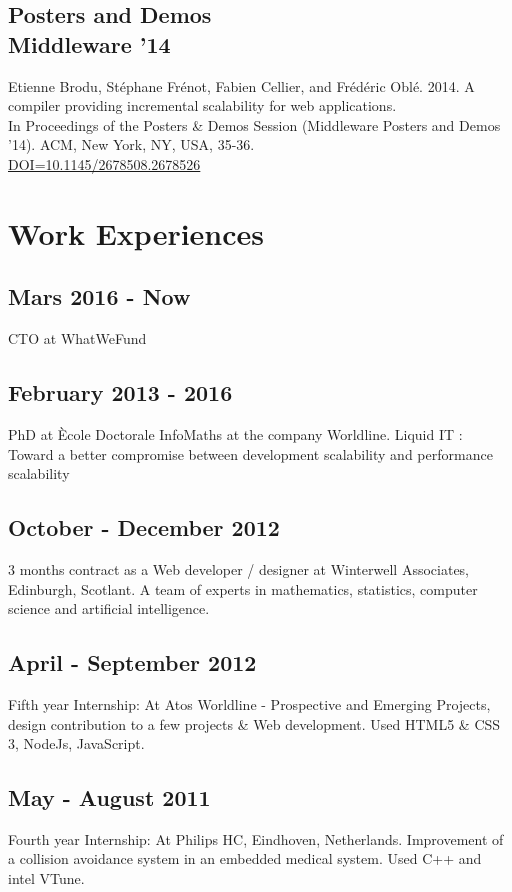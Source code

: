 	\subsection{Posters and Demos\\Middleware '14}{
		Etienne Brodu, Stéphane Frénot, Fabien Cellier, and Frédéric Oblé. 2014.
		A compiler providing incremental scalability for web applications.\\
		In Proceedings of the Posters \& Demos Session (Middleware Posters and Demos '14).
		ACM, New York, NY, USA, 35-36.\\
		\href{http://doi.acm.org/10.1145/2678508.2678526}{DOI=10.1145/2678508.2678526}
	}

\section{Work Experiences}

	\subsection{Mars 2016 - Now}
		{CTO at WhatWeFund}

	\subsection{February 2013 - 2016}
		{PhD at Ècole Doctorale InfoMaths at the company Worldline. Liquid IT : Toward a better compromise between development scalability and performance scalability}

	\subsection{October - December 2012}
		{3 months contract as a Web developer / designer at Winterwell Associates, Edinburgh, Scotlant. A team of experts in mathematics, statistics, computer science and artificial intelligence.}

	\subsection{April - September 2012}
		{Fifth year Internship: At Atos Worldline - Prospective and Emerging Projects, design contribution to a few projects \& Web development. Used HTML5 \& CSS 3, NodeJs, JavaScript.}

	\subsection{May - August 2011}
		{Fourth year Internship: At Philips HC, Eindhoven, Netherlands. Improvement of a collision avoidance system in an embedded medical system. Used C++ and intel VTune.}

